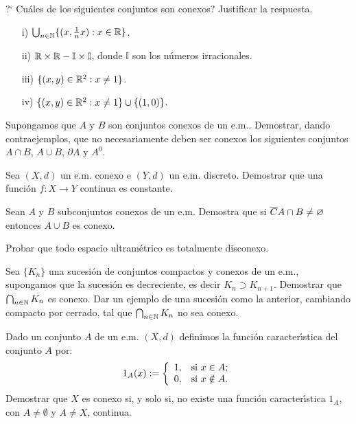 \begin{ejercicio}{} ?` Cu\'ales de los siguientes conjuntos son
conexos? Justificar la respuesta.
\begin{itemize}
    \item[i)] $\bigcup_{n\in\mathbb{N}}\{(x,\frac1nx):x\in\mathbb{R}\}$.
    \item[ii)] $\mathbb{R}\times\mathbb{R}-\mathbb{I}\times\mathbb{I}$, donde
    $\mathbb{I}$ son los n\'umeros irracionales.
    \item[iii)] $\{(x,y)\in\mathbb{R}^2:x\neq 1\}$.
    \item[iv)] $\{(x,y)\in\mathbb{R}^2:x\neq 1\}\cup\{(1,0)\}$.
\end{itemize}
\end{ejercicio}

\begin{ejercicio}{} Supongamos que  $A$ y $B$ son conjuntos conexos
de un e.m.. Demostrar, dando contraejemplos, que no necesariamente
deben ser conexos los siguientes conjuntos $A\cap B$, $A\cup B$,
$\partial A$ y $A^0$.
\end{ejercicio}

\begin{ejercicio}{} Sea $(X,d)$ un e.m. conexo e $(Y,d)$ un e.m. discreto.
Demostrar que una funci\'on $f:X\to Y$ continua es constante.
\end{ejercicio}

\begin{ejercicio}{} Sean $A$ y $B$ subconjuntos conexos de un e.m.
Demostra que si $\overline{C}{A}\cap B\neq\varnothing$ entonces $A\cup B$ es
conexo.
\end{ejercicio}

\begin{ejercicio}{} Probar que todo espacio ultram\'etrico es
totalmente disconexo.
\end{ejercicio}

\begin{ejercicio}{} Sea $\{K_n\}$ una sucesi\'on de conjuntos compactos y conexos
de un e.m., supongamos que la sucesi\'on es decreciente, es decir
$K_n\supset K_{n+1}$. Demostrar que $\bigcap_{n\in\mathbb{N}} K_n$ es
conexo. Dar un ejemplo de una sucesi\'on como la anterior,
cambiando compacto por cerrado, tal que $\bigcap_{n\in\mathbb{N}}K_n$ no
sea conexo.
\end{ejercicio}

\begin{ejercicio}{} Dado un conjunto $A$ de un e.m. $(X,d)$
definimos la funci\'on caracter\'{\i}stica del conjunto $A$ por:
\[
    1_A(x):=\left\{%
\begin{array}{ll}
    1, & \hbox{si $x\in A$;} \\
    0, & \hbox{si $x\notin A$.} \\
\end{array}%
\right.
\]
Demostrar que $X$ es conexo si, y solo si, no existe una funci\'on
caracter\'{\i}stica $1_A$, con $A\neq\emptyset$ y $A\neq X$,
continua.
\end{ejercicio}

